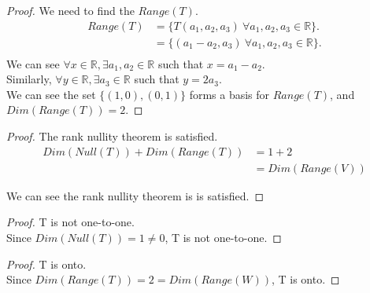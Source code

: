 \documentclass[12pt]{article}
\newenvironment{exercise}[2][Exercise]{\begin{trivlist}
\item[\hskip \labelsep{\bfseries #1}\hskip \labelsep{\bfseries #2.}]}{\end{trivlist}}
\begin{document}
\begin{exercise}{2.1.2}
\begin{proof}
        \noindent We need to find the $Range(T)$. \\
        \noindent
        \begin{align*}
        Range(T) 
            &= \{T(a_1, a_2, a_3)\ \forall a_1, a_2, a_3 \in \mathbb{R}\}. \\
            &= \{(a_1-a_2, a_3)\ \forall a_1, a_2, a_3 \in \mathbb{R}\}. \\
        \end{align*}
        We can see $\forall x \in \mathbb{R}, \exists a_1, a_2 \in \mathbb{R}$ such that $x = a_1 - a_2$. \\
        Similarly, $\forall y \in \mathbb{R}, \exists a_3 \in \mathbb{R}$ such that $y = 2a_3$. \\
        We can see the set $\{(1, 0), (0, 1)\}$ forms a basis for $Range(T)$, and $Dim(Range(T)) = 2$.

    \end{proof}

    \begin{proof} The rank nullity theorem is satisfied. \\

        \begin{align*}
            Dim(Null(T)) + Dim(Range(T))
            &= 1 + 2 \\
            &= Dim(Range(V))
        \end{align*}
        
        \noindent We can see the rank nullity theorem is is satisfied.

    \end{proof}

    \begin{proof} T is not one-to-one. \\

        \noindent Since $Dim(Null(T)) = 1 \neq 0$, T is not one-to-one.

    \end{proof}

    \begin{proof} T is onto. \\

        \noindent Since $Dim(Range(T)) = 2 = Dim(Range(W))$, T is onto.

    \end{proof}

\end{exercise}
\end{document}
